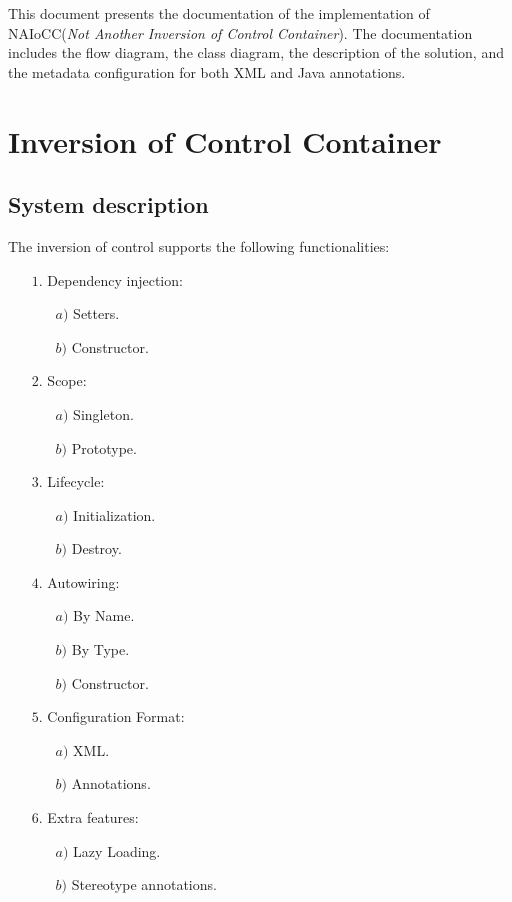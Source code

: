 \documentclass[a4paper, 12pt, notitlepage]{report}
\begin{document}
This document presents the documentation of the implementation of NAIoCC(\textit{Not Another Inversion of Control Container}). The documentation includes the flow diagram, the class diagram, the description of the solution, and the metadata configuration for both XML and Java annotations.


\chapter{Inversion of Control Container}
%
\section{System description}
%
The inversion of control supports the following functionalities:
\begin{itemize}
    \item[$1.$] Dependency injection:
    \begin{itemize}
        \item[$a)$] Setters.
        \item[$b)$] Constructor.
    \end{itemize}
    \item[$2.$] Scope:
    \begin{itemize}
        \item[$a)$] Singleton.
        \item[$b)$] Prototype.
    \end{itemize}
    \item[$3.$] Lifecycle:
    \begin{itemize}
        \item[$a)$] Initialization.
        \item[$b)$] Destroy.
    \end{itemize}
    \item[$4.$] Autowiring:
    \begin{itemize}
        \item[$a)$] By Name.
        \item[$b)$] By Type.
        \item[$b)$] Constructor.
    \end{itemize}
    \item[$5.$] Configuration Format:
    \begin{itemize}
        \item[$a)$] XML.
        \item[$b)$] Annotations.
    \end{itemize}
    \item[$6.$] Extra features:
    \begin{itemize}
        \item[$a)$] Lazy Loading.
        \item[$b)$] Stereotype annotations.
    \end{itemize}
\end{itemize}
\end{document}
